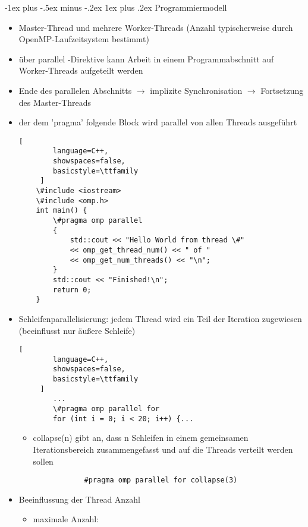 \documentclass[10pt]{article}
\makeatletter
\renewcommand{\subsubsection}{\@startsection{subsubsection}{3}{0mm}%
                                {-1ex plus -.5ex minus -.2ex}%
                                {1ex plus .2ex}%
                                {\normalfont\small\bfseries}}
\makeatother
\begin{document}
\subsubsection{Programmiermodell}
\begin{itemize}
  \item Master-Thread und mehrere Worker-Threads (Anzahl typischerweise durch OpenMP-Laufzeitsystem bestimmt)
  \item über parallel -Direktive kann Arbeit in einem Programmabschnitt auf Worker-Threads aufgeteilt werden
  \item Ende des parallelen Abschnitts $\rightarrow$ implizite Synchronisation $\rightarrow$ Fortsetzung des Master-Threads
  \item der dem 'pragma' folgende Block wird parallel von allen Threads ausgeführt
        \begin{lstlisting}[
        language=C++,
        showspaces=false,
        basicstyle=\ttfamily
     ]
    \#include <iostream>
    \#include <omp.h>
    int main() {
        \#pragma omp parallel
        {
            std::cout << "Hello World from thread \#"
            << omp_get_thread_num() << " of "
            << omp_get_num_threads() << "\n";
        }
        std::cout << "Finished!\n";
        return 0;
    }
    \end{lstlisting}
  \item Schleifenparallelisierung: jedem Thread wird ein Teil der Iteration zugewiesen (beeinflusst nur äußere Schleife)
        \begin{lstlisting}[
        language=C++,
        showspaces=false,
        basicstyle=\ttfamily
     ]
        ...
        \#pragma omp parallel for
        for (int i = 0; i < 20; i++) {...
    \end{lstlisting}
        \begin{itemize}
          \item collapse(n) gibt an, dass n Schleifen in einem gemeinsamen Iterationsbereich zusammengefasst und auf die Threads verteilt werden sollen
                \begin{lstlisting}
            #pragma omp parallel for collapse(3)
        \end{lstlisting}
        \end{itemize}
  \item Beeinflussung der Thread Anzahl
        \begin{itemize}
          \item maximale Anzahl:
                \begin{lstlisting}

\end{lstlisting}
\end{itemize}
\end{itemize}
\end{document}
